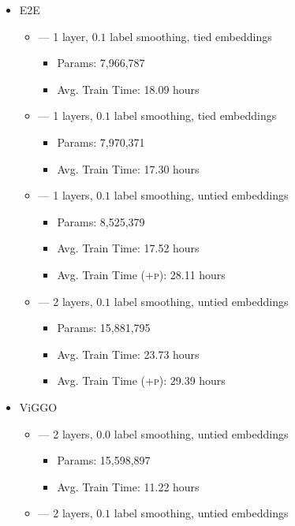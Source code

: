 \begin{itemize}
    \item E2E
\begin{itemize}
    \item {} --- 1 layer, $0.1$ label smoothing, tied embeddings
        \begin{itemize}
            \item Params: 7,966,787
            \item Avg. Train Time: 18.09 hours
        \end{itemize}
    \item {} --- 1 layers, $0.1$ label smoothing, tied embeddings
        \begin{itemize}
            \item Params: 7,970,371
            \item Avg. Train Time: 17.30 hours
        \end{itemize}
    \item {} --- 1 layers, $0.1$ label smoothing, untied embeddings
        \begin{itemize}
            \item Params: 8,525,379
            \item Avg. Train Time: 17.52 hours
            \item Avg. Train Time (\textsc{+p}): 28.11 hours
        \end{itemize}
    \item {} --- 2 layers, $0.1$ label smoothing, untied embeddings
        \begin{itemize}
            \item Params: 15,881,795
            \item Avg. Train Time: 23.73 hours
            \item Avg. Train Time (\textsc{+p}): 29.39 hours
        \end{itemize}
\end{itemize}
\item ViGGO
\begin{itemize}
    \item {} --- 2 layers, $0.0$ label smoothing, untied embeddings
        \begin{itemize}
            \item Params: 15,598,897
            \item Avg. Train Time: 11.22 hours
        \end{itemize}
    \item {} --- 2 layers, $0.1$ label smoothing, untied embeddings

\end{itemize}
\end{itemize}
